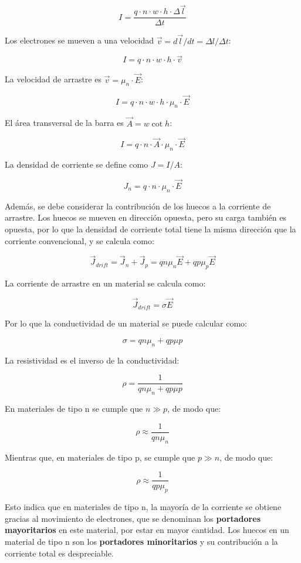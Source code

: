 \[ I = \dfrac{q \cdot n \cdot w \cdot h \cdot \Delta \vec{l}}{\Delta{}t} \]

Los electrones se mueven a una velocidad $\vec{v} = d\vec{l}/dt = \Delta{}l/\Delta{}t$:

\[ I = q \cdot n \cdot w \cdot h \cdot \vec{v} \]

La velocidad de arrastre es $\vec{v} = \mu_n \cdot \vec{E}$:

\[ I = q \cdot n \cdot w \cdot h \cdot \mu_n \cdot \vec{E} \]

El área transversal de la barra es $\vec{A} = w \cot h$:

\[ I = q \cdot n \cdot \vec{A} \cdot \mu_n \cdot \vec{E} \]

La densidad de corriente se define como $J=I/A$:

\[ J_n = q \cdot n \cdot \mu_n \cdot \vec{E} \]

Además, se debe considerar la contribución de los huecos a la corriente de arrastre. Los huecos se mueven en dirección opuesta, pero su carga también es opuesta, por lo que la densidad de corriente total tiene la misma dirección que la corriente convencional, y se calcula como:

\[ \vec{J}_{drift} = \vec{J}_n + \vec{J}_p = q n \mu_n \vec{E} + q p \mu_p \vec{E} \]

La corriente de arrastre en un material se calcula como:

\[ \vec{J}_{drift} =  \sigma \vec{E} \]

Por lo que la conductividad de un material se puede calcular como:

\[ \sigma = q n \mu_n + q p \mu p \]

La resistividad es el inverso de la conductividad:

\[ \rho = \dfrac{1}{q n \mu_n + q p \mu p} \]

En materiales de tipo n se cumple que $n \gg p$, de modo que:

\[ \rho \approx \dfrac{1}{q n \mu_n} \]

Mientras que, en materiales de tipo p, se cumple que $p \gg n$, de modo que:

\[ \rho \approx \dfrac{1}{q p \mu_p} \]

Esto indica que en materiales de tipo n, la mayoría de la corriente se obtiene gracias al movimiento de electrones, que se denominan los \textbf{portadores mayoritarios} en este material, por estar en mayor cantidad. Los huecos en un material de tipo n son los \textbf{portadores minoritarios} y su contribución a la corriente total es despreciable.

